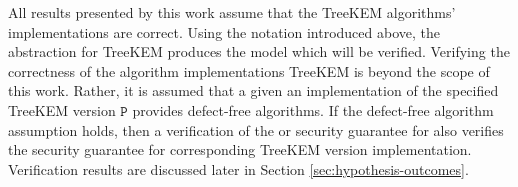 All results presented by this work assume that the TreeKEM algorithms' implementations are correct.
Using the notation introduced above, the  abstraction for TreeKEM produces the \CGKAmod{\VersionOne}{}{} model which will be verified.
Verifying the correctness of the  algorithm implementations TreeKEM is beyond the scope of this work.
Rather, it is assumed that a given an implementation of the specified TreeKEM version \(\mathtt{P}\) provides defect-free algorithms.
If the defect-free algorithm assumption holds, then a verification of the  or  security guarantee for  also verifies the security guarantee for corresponding TreeKEM version implementation.
Verification results are discussed later in Section \ref{sec:hypothesis-outcomes}.
